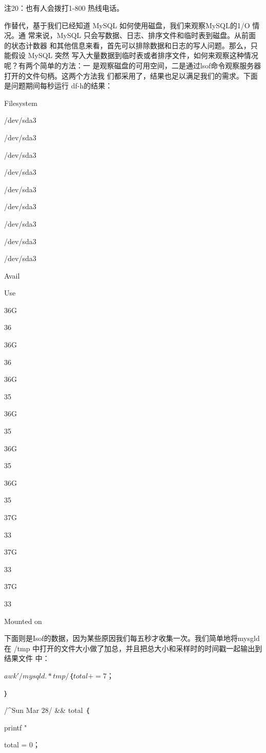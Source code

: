 {注20：也有人会拨打1-800 热线电话。

作替代，基于我们已经知道 MySQL 如何使用磁盘，我们来观察MySQL的1/O 情况。通
常来说，MySQL 只会写数据、日志、排序文件和临时表到磁盘。从前面的状态计数器
和其他信息来看，首先可以排除数据和日志的写人问题。那么，只能假设 MySQL 突然
写入大量数据到临时表或者排序文件，如何来观察这种情况呢？有两个简单的方法：一
是观察磁盘的可用空间，二是通过lsof命令观察服务器打开的文件句柄。这两个方法我
们都采用了，结果也足以满足我们的需求。下面是问题期间每秒运行 df-h的结果：

Filesystem

/dev/sda3

/dev/sda3

/dev/sda3

/dev/sda3

/dev/sda3

/dev/sda3

/dev/sda3

/dev/sda3

/dev/sda3

Avail

Use%

36G

36%

36G

36%

36G

35%

36G

35%

36G

35%

36G

35%

37G

33%

37G

33%

37G

33%

Mounted on

下面则是Isof的数据，因为某些原因我们每五秒才收集一次。我们简单地将mysgld 在
/tmp 中打开的文件大小做了加总，并且把总大小和采样时的时间戳一起输出到结果文件
中：

$ awk'

/mysqld.*tmp/ ｛

total += $7；

｝

/^Sun Mar 28/ && total ｛

printf "%

total = 0；

}

